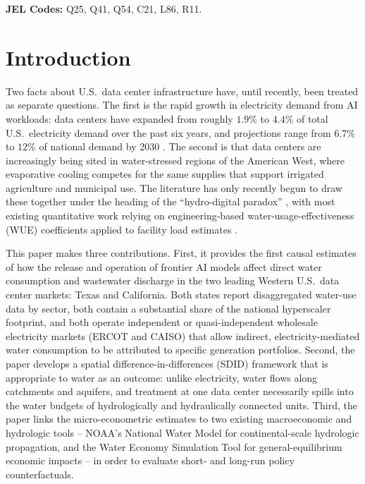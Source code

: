 \documentclass[11pt, letterpaper]{article}
\begin{document}
\noindent \textbf{JEL Codes:} Q25, Q41, Q54, C21, L86, R11.


\section{Introduction}
\label{sec:introduction}

Two facts about U.S.\ data center infrastructure have, until recently, been treated as separate questions. The first is the rapid growth in electricity demand from AI workloads: data centers have expanded from roughly $1.9\%$ to $4.4\%$ of total U.S.\ electricity demand over the past six years, and projections range from $6.7\%$ to $12\%$ of national demand by 2030 \citep{EPRI2024}. The second is that data centers are increasingly being sited in water-stressed regions of the American West, where evaporative cooling competes for the same supplies that support irrigated agriculture and municipal use. The literature has only recently begun to draw these together under the heading of the ``hydro-digital paradox'' \citep{natarajan2025hydro}, with most existing quantitative work relying on engineering-based water-usage-effectiveness (WUE) coefficients applied to facility load estimates \citep{li2023making,mytton2021data,lei2025water,shumba2025water,herrera2025sustainable}.

This paper makes three contributions. First, it provides the first causal estimates of how the release and operation of frontier AI models affect direct water consumption and wastewater discharge in the two leading Western U.S.\ data center markets: Texas and California. Both states report disaggregated water-use data by sector, both contain a substantial share of the national hyperscaler footprint, and both operate independent or quasi-independent wholesale electricity markets (ERCOT and CAISO) that allow indirect, electricity-mediated water consumption to be attributed to specific generation portfolios. Second, the paper develops a spatial difference-in-differences (SDID) framework that is appropriate to water as an outcome: unlike electricity, water flows along catchments and aquifers, and treatment at one data center necessarily spills into the water budgets of hydrologically and hydraulically connected units. Third, the paper links the micro-econometric estimates to two existing macroeconomic and hydrologic tools -- NOAA's National Water Model \citep{cosgrove2024nwm} for continental-scale hydrologic propagation, and the Water Economy Simulation Tool \citep{reimer2020west} for general-equilibrium economic impacts -- in order to evaluate short- and long-run policy counterfactuals.
\end{document}

